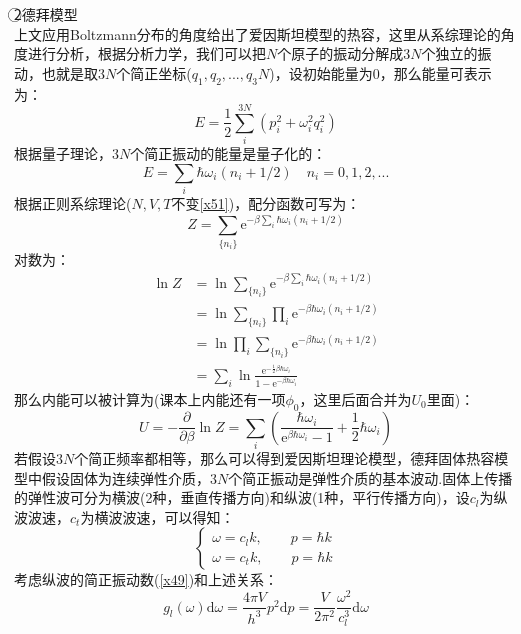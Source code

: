 \documentclass[12pt]{article}
\begin{document}
\noindent
\textcircled{2}德拜模型\\
上文应用Boltzmann分布的角度给出了爱因斯坦模型的热容，这里从系综理论的角度进行分析，根据分析力学，我们可以把$N$个原子的振动分解成$3N$个独立的振动，也就是取$3N$个简正坐标($q_1,q_2,...,q_3N$)，设初始能量为0，那么能量可表示为：
\begin{equation}
	E=\frac{1}{2}\sum_i^{3N}(p_i^2+\omega_i^2 q_i^2)
\end{equation}
根据量子理论，$3N$个简正振动的能量是量子化的：
\begin{equation}
	E=\sum_i \hbar\omega_i(n_i+1/2)\quad n_i=0,1,2,...
\end{equation}
根据正则系综理论($N,V,T$不变\ref{x51})，配分函数可写为：
\begin{equation}
	Z=\sum_{\{n_i\}}\mathrm{e}^{-\beta\sum_i\hbar\omega_i(n_i+1/2)}
\end{equation}
对数为：
\begin{equation}
	\begin{split}
	\ln Z&=\ln \sum_{\{n_i\}}\mathrm{e}^{-\beta\sum_i\hbar\omega_i(n_i+1/2)}\\
	&=\ln \sum_{\{n_i\}}\prod_i \mathrm{e}^{-\beta\hbar\omega_i(n_i+1/2)}\\
	&=\ln \prod_i\sum_{\{n_i\}}\mathrm{e}^{-\beta\hbar\omega_i(n_i+1/2)}\\
	&=\sum_i\ln \frac{\mathrm{e}^{-\frac{1}{2}\beta\hbar\omega_i}}{1-\mathrm{e}^{-\beta\hbar\omega_i}}
\end{split}
\end{equation}
那么内能可以被计算为(课本上内能还有一项$\phi_0$，这里后面合并为$U_0$里面)：
\begin{equation}
	U=-\frac{\partial}{\partial \beta}\ln Z=\sum_i (\frac{\hbar\omega_i}{\mathrm{e}^{\beta\hbar\omega_i}-1}+\frac{1}{2}\hbar\omega_i)
	\label{x52}
\end{equation}
若假设$3N$个简正频率都相等，那么可以得到爱因斯坦理论模型，德拜固体热容模型中假设固体为连续弹性介质，$3N$个简正振动是弹性介质的基本波动.固体上传播的弹性波可分为横波(2种，垂直传播方向)和纵波(1种，平行传播方向)，设$c_l$为纵波波速，$c_t$为横波波速，可以得知：
\begin{equation}
	\left \{\begin{split}
		\omega=c_l k,\quad\quad p=\hbar k\\
		\omega=c_t k,\quad\quad p=\hbar k
	\end{split}\right. 
\end{equation}
考虑纵波的简正振动数(\ref{x49})和上述关系：
\begin{equation}
	g_l(\omega)\mathrm{d}\omega=\frac{4\pi V}{h^3}p^2\mathrm{d}p=\frac{V}{2\pi^2}\frac{\omega^2}{c_l^3}\mathrm{d}\omega
\end{equation}
\end{document}

